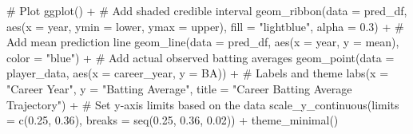 \documentclass[
  letterpaper,
  DIV=11,
  numbers=noendperiod]{scrartcl}
\newenvironment{Shaded}{\begin{snugshade}}{\end{snugshade}}
\newcommand{\AttributeTok}[1]{\textcolor[rgb]{0.40,0.45,0.13}{#1}}
\newcommand{\CommentTok}[1]{\textcolor[rgb]{0.37,0.37,0.37}{#1}}
\newcommand{\FloatTok}[1]{\textcolor[rgb]{0.68,0.00,0.00}{#1}}
\newcommand{\FunctionTok}[1]{\textcolor[rgb]{0.28,0.35,0.67}{#1}}
\newcommand{\NormalTok}[1]{\textcolor[rgb]{0.00,0.23,0.31}{#1}}
\newcommand{\SpecialCharTok}[1]{\textcolor[rgb]{0.37,0.37,0.37}{#1}}
\newcommand{\StringTok}[1]{\textcolor[rgb]{0.13,0.47,0.30}{#1}}
\begin{document}
\begin{Shaded}
\begin{Highlighting}[]
\CommentTok{\# Plot}
\FunctionTok{ggplot}\NormalTok{() }\SpecialCharTok{+}
    \CommentTok{\# Add shaded credible interval}
    \FunctionTok{geom\_ribbon}\NormalTok{(}\AttributeTok{data =}\NormalTok{ pred\_df,}
                \FunctionTok{aes}\NormalTok{(}\AttributeTok{x =}\NormalTok{ year, }\AttributeTok{ymin =}\NormalTok{ lower, }\AttributeTok{ymax =}\NormalTok{ upper),}
                \AttributeTok{fill =} \StringTok{"lightblue"}\NormalTok{, }\AttributeTok{alpha =} \FloatTok{0.3}\NormalTok{) }\SpecialCharTok{+}
    \CommentTok{\# Add mean prediction line}
    \FunctionTok{geom\_line}\NormalTok{(}\AttributeTok{data =}\NormalTok{ pred\_df,}
              \FunctionTok{aes}\NormalTok{(}\AttributeTok{x =}\NormalTok{ year, }\AttributeTok{y =}\NormalTok{ mean),}
              \AttributeTok{color =} \StringTok{"blue"}\NormalTok{) }\SpecialCharTok{+}
    \CommentTok{\# Add actual observed batting averages}
    \FunctionTok{geom\_point}\NormalTok{(}\AttributeTok{data =}\NormalTok{ player\_data,}
               \FunctionTok{aes}\NormalTok{(}\AttributeTok{x =}\NormalTok{ career\_year, }\AttributeTok{y =}\NormalTok{ BA)) }\SpecialCharTok{+}
    \CommentTok{\# Labels and theme}
    \FunctionTok{labs}\NormalTok{(}\AttributeTok{x =} \StringTok{"Career Year"}\NormalTok{,}
         \AttributeTok{y =} \StringTok{"Batting Average"}\NormalTok{,}
         \AttributeTok{title =} \StringTok{"Career Batting Average Trajectory"}\NormalTok{) }\SpecialCharTok{+}
    \CommentTok{\# Set y{-}axis limits based on the data}
    \FunctionTok{scale\_y\_continuous}\NormalTok{(}\AttributeTok{limits =} \FunctionTok{c}\NormalTok{(}\FloatTok{0.25}\NormalTok{, }\FloatTok{0.36}\NormalTok{), }
                      \AttributeTok{breaks =} \FunctionTok{seq}\NormalTok{(}\FloatTok{0.25}\NormalTok{, }\FloatTok{0.36}\NormalTok{, }\FloatTok{0.02}\NormalTok{)) }\SpecialCharTok{+}
    \FunctionTok{theme\_minimal}\NormalTok{()}
\end{Highlighting}
\end{Shaded}
\end{document}
